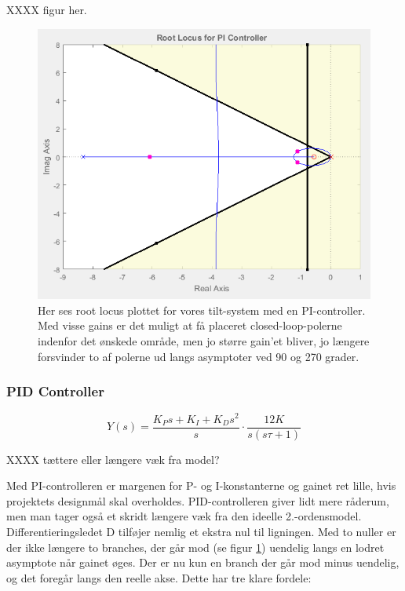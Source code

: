 XXXX figur her.
\begin{figure}[!ht]
	\begin{center}
		\includegraphics[scale=0.45]{Billeder/PI_rlocus.PNG}
	\end{center}
\caption{Her ses root locus plottet for vores tilt-system med en PI-controller. Med visse gains er det muligt at få placeret closed-loop-polerne indenfor det ønskede område, men jo større gain'et bliver, jo længere forsvinder to af polerne ud langs asymptoter ved 90 og 270 grader.}
\label{fig:PI_rlocus}
\end{figure}

\subsubsection{PID Controller}

\begin{equation}\label{eq:PID_OpenLoop}
Y(s)=\frac{K_{P}s+K_{I}+K_{D}s^2}{s}\cdot\frac{12K}{s(s\tau+1)}
\end{equation}


XXXX tættere eller længere væk fra model?

Med PI-controlleren er margenen for P- og I-konstanterne og gainet ret lille, hvis projektets designmål skal overholdes. PID-controlleren giver lidt mere råderum, men man tager også et skridt længere væk fra den ideelle 2.-ordensmodel. Differentieringsledet D tilføjer nemlig et ekstra nul til ligningen. Med to nuller er der ikke længere to branches, der går mod (se figur \ref{fig:PI_rlocus}) uendelig langs en lodret asymptote når gainet øges. Der er nu kun en branch der går mod minus uendelig, og det foregår langs den reelle akse. Dette har tre klare fordele:

